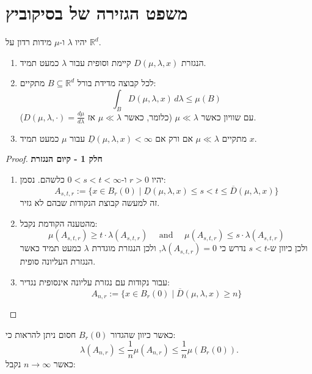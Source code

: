 \documentclass{tstextbook}
\begin{document}
\section{משפט הגזירה של בסיקוביץ}

\begin{theorem}
יהיו \(\lambda\) ו-\(\mu\) מידות רדון על \(\mathbb{R}^d\).

  \begin{enumerate}
    \item הנגזרת \(D(\mu, \lambda, x)\) קיימת וסופית עבור \(\lambda\) כמעט תמיד. 


    \item לכל קבוצה מדידת בורל \(B \subseteq \mathbb{R}^d\) מתקיים: 
$$ \int_B D(\mu, \lambda, x) \, d\lambda \leq \mu(B) $$
עם שוויון כאשר \(\mu \ll \lambda\) (כלומר, כאשר \(\mu \ll \lambda\) אז \(D(\mu, \lambda, \cdot) = \frac{d\mu}{d\lambda}\)).


    \item מתקיים \(\mu \ll \lambda\) אם ורק אם \(\underline{D}(\mu, \lambda, x) < \infty\) עבור \(\mu\) כמעט תמיד \(x\). 


  \end{enumerate}
\end{theorem}
\begin{proof}
\textbf{חלק 1 - קיום הנגזרת}

  \begin{enumerate}
    \item יהיו \(r > 0\) ו-\(0 < s < t < \infty\) כלשהם. נסמן: 
$$ A_{s,t,r} := \{x \in B_r(0) \mid \underline{D}(\mu, \lambda, x) \leq s < t \leq \overline{D}(\mu, \lambda, x)\} $$
זה למעשה קבוצת הנקודות שבהם לא גזיר.


    \item מהטענה הקודמת נקבל: 
$$ \mu(A_{s,t,r}) \geq t \cdot \lambda(A_{s,t,r}) \quad \text{ and }\quad  \mu(A_{s,t,r}) \leq s \cdot \lambda(A_{s,t,r}) $$
ולכן כיוון ש-\(s< t\) נדרש כי \(\lambda(A_{s,t,r})=0\), ולכן הנגזרת מוגדרת \(\lambda\) כמעט תמיד כאשר הנגזרת העליונה סופית.


    \item עבור נקודות עם נגזרת עליונה אינסופית נגדיר: 
$$ A_{n,r} := \{x \in B_r(0) \mid \overline{D}(\mu, \lambda, x) \geq n\} $$


  \end{enumerate}
\end{proof}
כאשר כיוון שהגדור \(B_{r}(0)\) חסום ניתן להראות כי:
$$\lambda(A_{n,r})\leq\frac{1}{n}\mu(A_{n,r})\leq\frac{1}{n}\mu(B_{r}(0)).$$
כאשר \(n\to \infty\) נקבל:
\end{document}
